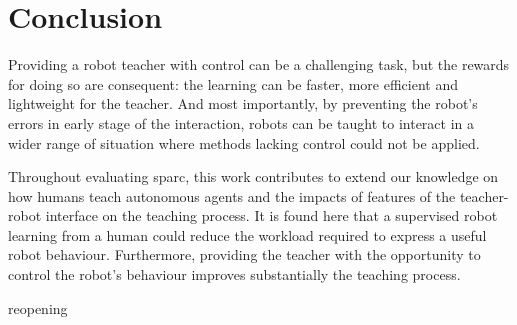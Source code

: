 \section{Conclusion}\label{sec:conc_conc}


Providing a robot teacher with control can be a challenging task, but the rewards for doing so are consequent: the learning can be faster, more efficient and lightweight for the teacher. And most importantly, by preventing the robot's errors in early stage of the interaction, robots can be taught to interact in a wider range of situation where methods lacking control could not be applied.

Throughout evaluating \gls{sparc}, this work contributes to extend our knowledge on how humans teach autonomous agents and the impacts of features of the teacher-robot interface on the teaching process. It is found here that a supervised robot learning from a human could reduce the workload required to express a useful robot behaviour. Furthermore, providing the teacher with the opportunity to control the robot's behaviour improves substantially the teaching process.


reopening